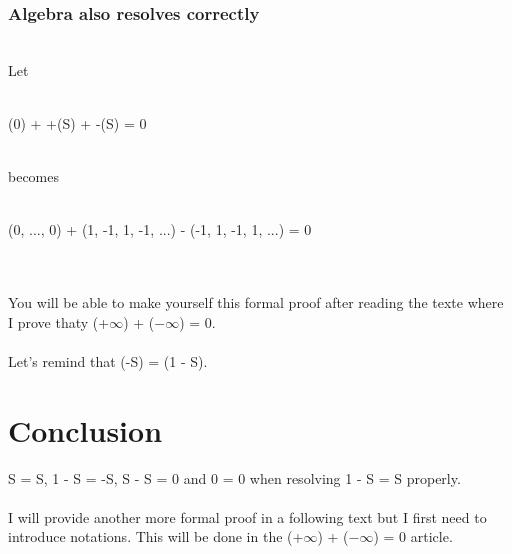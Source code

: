 \documentclass{article}
\begin{document}
      \subsubsection{Algebra also resolves correctly}
        ~\\
        Let
        ~\\
        ~\\
        \centerline{
        (0) + +(S) + -(S) = 0
        }
        ~\\
        becomes
        ~\\
        ~\\
        \centerline{
        (0, ..., 0) + (1, -1, 1, -1, ...) - (-1, 1, -1, 1, ...) = 0
        }
        ~\\
        ~\\
        You will be able to make yourself this formal proof after reading the texte where I prove thaty (+$\infty$) + ($-\infty$) = 0.
        ~\\
        ~\\
        Let's remind that (-S) = (1 - S).
  \section{Conclusion}
    S = S, 1 - S = -S, S - S = 0 and 0 = 0 when resolving 1 - S = S properly.
    ~\\
    ~\\
    I will provide another more formal proof in a following text but I first need to introduce notations. This will be done in the (+$\infty$) + ($-\infty$) = 0 article.
\end{document}
